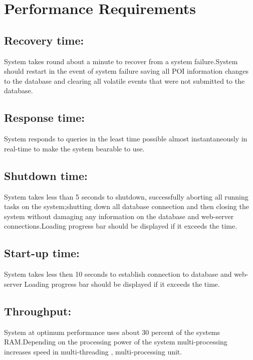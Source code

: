 
\section{Performance Requirements}
\subsection{Recovery time:}
	System takes round about a minute to recover from a system failure.System should 				restart in the event of system failure saving all POI information changes to the 				database and clearing all volatile events that were  not submitted to the database.
\subsection{Response time:}
	System responds to queries in the least time possible almost instantaneously in 				real-time  to make the system bearable to use.
\subsection{Shutdown time:}
	System takes less than 5 seconds to shutdown, successfully aborting all running 				tasks on the system;shutting down all database connection and then closing the system 			without damaging any information on the database and web-server connections.Loading 			progress bar should be displayed if it exceeds the time.
\subsection{Start-up time:}
	System takes less then 10 seconds to establish connection to database and web-server
	Loading progress bar should be displayed if it exceeds the time.
\subsection{Throughput:}
	System at optimum performance uses about 30 percent of the systems RAM.Depending on the 		processing power of the system multi-processing increases speed in multi-threading , 			multi-processing unit.

